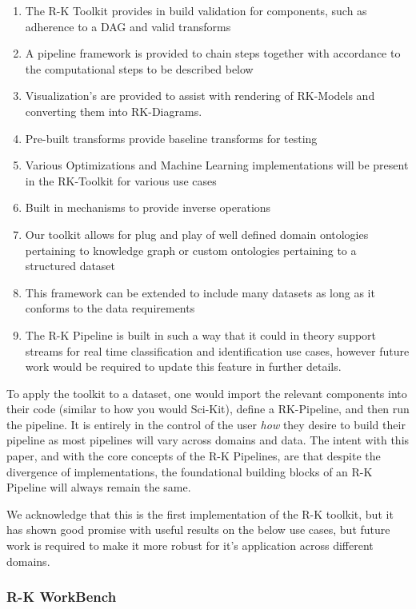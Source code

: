 \begin{enumerate}
    \item{The R-K Toolkit provides in build validation for components, such as adherence to a DAG and valid transforms}
    \item{A pipeline framework is provided to chain steps together with accordance to the computational steps to be described below}
    \item{Visualization's are provided to assist with rendering of RK-Models and converting them into RK-Diagrams.}
    \item{Pre-built transforms provide baseline transforms for testing }
    \item{Various Optimizations and Machine Learning implementations will be present in the RK-Toolkit for various use cases}
    \item{Built in mechanisms to provide inverse operations}
    \item{Our toolkit allows for plug and play of well defined domain ontologies pertaining to knowledge graph or custom ontologies pertaining to a structured dataset}
    \item{This framework can be extended to include many datasets as long as it conforms to the data requirements}
    \item{The R-K Pipeline is built in such a way that it could in theory support streams for real time classification and identification use cases, however future work would be required to update this feature in further details.}
\end{enumerate}

To apply the toolkit to a dataset, one would import the relevant components into their code (similar to how you would Sci-Kit), define a RK-Pipeline, and then run the pipeline. It is entirely in the control of the user \textit{how} they desire to build their pipeline as most pipelines will vary across domains and data. The intent with this paper, and with the core concepts of the R-K Pipelines, are that despite the divergence of implementations, the foundational building blocks of an R-K Pipeline will always remain the same.

We acknowledge that this is the first implementation of the R-K toolkit, but it has shown good promise with useful results on the below use cases, but future work is required to make it more robust for it's application across different domains.

\subsubsection{R-K WorkBench}

